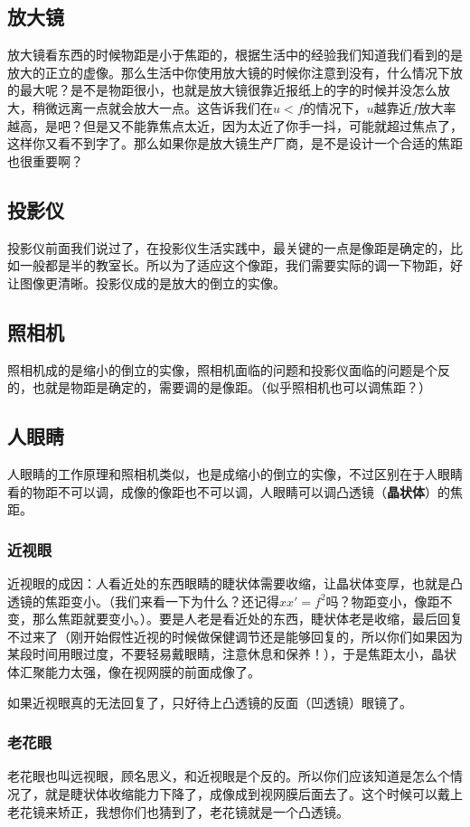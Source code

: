 \documentclass[12pt]{exam}
\begin{document}
\subsection{放大镜}
放大镜看东西的时候物距是小于焦距的，根据生活中的经验我们知道我们看到的是放大的正立的虚像。那么生活中你使用放大镜的时候你注意到没有，什么情况下放的最大呢？是不是物距很小，也就是放大镜很靠近报纸上的字的时候并没怎么放大，稍微远离一点就会放大一点。这告诉我们在$u<f$的情况下，$u$越靠近$f$放大率越高，是吧？但是又不能靠焦点太近，因为太近了你手一抖，可能就超过焦点了，这样你又看不到字了。那么如果你是放大镜生产厂商，是不是设计一个合适的焦距也很重要啊？

\subsection{投影仪}
投影仪前面我们说过了，在投影仪生活实践中，最关键的一点是像距是确定的，比如一般都是半的教室长。所以为了适应这个像距，我们需要实际的调一下物距，好让图像更清晰。投影仪成的是放大的倒立的实像。

\subsection{照相机}
照相机成的是缩小的倒立的实像，照相机面临的问题和投影仪面临的问题是个反的，也就是物距是确定的，需要调的是像距。（似乎照相机也可以调焦距？）

\subsection{人眼睛}
人眼睛的工作原理和照相机类似，也是成缩小的倒立的实像，不过区别在于人眼睛看的物距不可以调，成像的像距也不可以调，人眼睛可以调凸透镜（\textbf{晶状体}）的焦距。


\subsubsection{近视眼}
近视眼的成因：人看近处的东西眼睛的睫状体需要收缩，让晶状体变厚，也就是凸透镜的焦距变小。（我们来看一下为什么？还记得$xx'=f^2$吗？物距变小，像距不变，那么焦距就要变小。）。要是人老是看近处的东西，睫状体老是收缩，最后回复不过来了（刚开始假性近视的时候做保健调节还是能够回复的，所以你们如果因为某段时间用眼过度，不要轻易戴眼睛，注意休息和保养！），于是焦距太小，晶状体汇聚能力太强，像在视网膜的前面成像了。

如果近视眼真的无法回复了，只好待上凸透镜的反面（凹透镜）眼镜了。


\subsubsection{老花眼}
老花眼也叫远视眼，顾名思义，和近视眼是个反的。所以你们应该知道是怎么个情况了，就是睫状体收缩能力下降了，成像成到视网膜后面去了。这个时候可以戴上老花镜来矫正，我想你们也猜到了，老花镜就是一个凸透镜。
\end{document}
